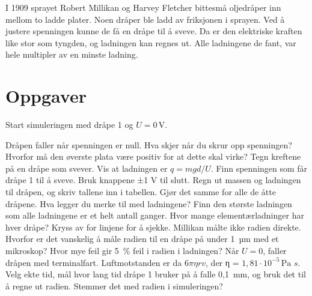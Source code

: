 \documentclass[11pt]{article}
\begin{document}

I 1909 sprayet Robert Millikan og Harvey Fletcher bittesmå oljedråper inn mellom to ladde plater. Noen dråper ble ladd av friksjonen i sprayen. Ved å justere spenningen kunne de få en dråpe til å sveve. Da er den elektriske kraften like stor som tyngden, og ladningen kan regnes ut. Alle ladningene de fant, var hele multipler av en minste ladning.

\section*{Oppgaver}

Start simuleringen med dråpe 1 og $U = 0\,\mathrm{V}$.

\begin{oppgaveliste}
\oppgave {}Dråpen faller når spenningen er null. Hva skjer når du skrur opp spenningen? Hvorfor må den øverste plata være positiv for at dette skal virke?
\svar
\oppgave {}Tegn kreftene på en dråpe som svever. Vis at ladningen er $q = mgd/U$.
\svar
\oppgave {}Finn spenningen som får dråpe 1 til å sveve. Bruk knappene ±1 V til slutt. Regn ut massen og ladningen til dråpen, og skriv tallene inn i tabellen.
\svar
\oppgave {}Gjør det samme for alle de åtte dråpene. Hva legger du merke til med ladningene?
\svar
\oppgave {}Finn den største ladningen som alle ladningene er et helt antall ganger. Hvor mange elementærladninger har hver dråpe? Kryss av for linjene for å sjekke.
\svar
\oppgave {}Millikan målte ikke radien direkte. Hvorfor er det vanskelig å måle radien til en dråpe på under 1~µm med et mikroskop? Hvor mye feil gir 5~\% feil i radien i ladningen?
\svar
\oppgave {}Når $U = 0$, faller dråpen med terminalfart. Luftmotstanden er da $6πηrv$, der η = $1{,}81 \cdot 10^{-5}\,\mathrm{Pa}$ $s$. Velg ekte tid, mål hvor lang tid dråpe 1 bruker på å falle 0,1~mm, og bruk det til å regne ut radien. Stemmer det med radien i simuleringen?
\svar
\end{oppgaveliste}
\end{document}
